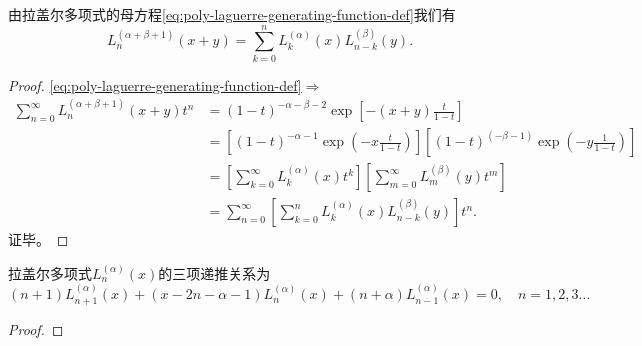 \begin{subappendices}
\begin{theorem}
  由拉盖尔多项式的母方程\eqref{eq:poly-laguerre-generating-function-def}我们有
  \begin{equation}
    L_n^{(\alpha + \beta + 1)}(x + y) = \sum_{k=0}^{n} L_{k}^{(\alpha)} (x) L_{n-k}^{(\beta)} (y).
  \end{equation}
\end{theorem}
\begin{proof}
  \eqref{eq:poly-laguerre-generating-function-def}$\Rightarrow$
  \begin{equation*}
    \begin{split}
    \sum_{n=0}^{\infty}  L_n^{(\alpha + \beta + 1)} (x + y) t^n &= (1-t)^{- \alpha - \beta -2} \exp \left[ - (x+y)\frac{t}{1-t}\right] \\
    &= \left[ (1-t)^{-\alpha -1} \exp \left( -x \frac{t}{1-t} \right) \right] \left[ (1-t)^{(-\beta - 1)} \exp \left(-y \frac{1}{1-t} \right) \right]\\
    &=\left[ \sum_{k=0}^{\infty} L_{k}^{(\alpha)} (x) t^k \right] \left[ \sum_{m=0}^{\infty} L_{m}^{(\beta)} (y) t^m\right] \\
    &=\sum_{n=0}^{\infty} \left[ \sum_{k=0}^{n} L_{k}^{(\alpha)}(x) L_{n-k}^{(\beta)}(y) \right] t^n.
    \end{split}
  \end{equation*}
  证毕。
\end{proof}

\begin{theorem}[拉盖尔多项式的三项递推关系]
  拉盖尔多项式$L_n^{(\alpha)}(x)$的三项递推关系为
  \begin{equation}
    \label{eq:poly-laguerre-three-term-recurrence-relation}
    (n+1) L_{n+1}^{(\alpha)}(x) + (x - 2n - \alpha - 1) L_{n}^{(\alpha)}(x) + (n+\alpha) L_{n-1}^{(\alpha)}(x) =0, \quad n = 1,2,3\ldots
  \end{equation}
\end{theorem}

\begin{proof}


\end{proof}
\end{subappendices}
